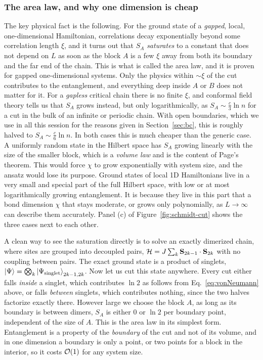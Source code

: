 \documentclass[lecture_notes.tex]{subfiles}
\begin{document}
\subsubsection{The area law, and why one dimension is cheap}
The key physical fact is the following. For the ground state of a \emph{gapped}, local,
one-dimensional Hamiltonian, correlations decay exponentially beyond some correlation length
$\xi$, and it turns out that $S_A$ \emph{saturates} to a constant that does not depend on $L$ as
soon as the block $A$ is a few $\xi$ away from both its boundary and the far end of the chain.
This is what is called the area law, and it is proven for gapped one-dimensional systems. Only
the physics within $\sim\xi$ of the cut contributes to the entanglement, and everything deep
inside $A$ or $B$ does not matter for it. For a \emph{gapless} critical chain there is no finite
$\xi$, and conformal field theory tells us that $S_A$ grows instead, but only logarithmically, as
$S_A \sim \tfrac{c}{3}\ln n$ for a cut in the bulk of an infinite or periodic chain. With open
boundaries, which we use in all this session for the reasons given in Section~\ref{sec:bc}, this
is roughly halved to $S_A\sim\tfrac{c}{6}\ln n$. In both cases this is much cheaper than the
generic case. A uniformly random state in the Hilbert space has $S_A$ growing linearly with the
size of the smaller block, which is a \emph{volume law} and is the content of Page's theorem. This
would force $\chi$ to grow exponentially with system size, and the ansatz would lose its purpose.
Ground states of local 1D Hamiltonians live in a very small and special part of the full Hilbert
space, with low or at most logarithmically growing entanglement. It is because they live in this
part that a bond dimension $\chi$ that stays moderate, or grows only polynomially, as
$L\to\infty$ can describe them accurately. Panel (c) of Figure~\ref{fig:schmidt-cut} shows the
three cases next to each other.

A clean way to see the saturation directly is to solve an exactly dimerized chain, where sites
are grouped into decoupled pairs, $\mathcal{H} = J\sum_k \vb S_{2k-1}\cdot\vb S_{2k}$ with no coupling
between pairs. The exact ground state is a product of singlets,
$\ket{\Psi} = \bigotimes_k \ket{\Psi_{\mathrm{singlet}}}_{2k-1,2k}$. Now let us cut this state
anywhere. Every cut either falls \emph{inside} a singlet, which contributes $\ln 2$ as follows from
Eq.~\eqref{eq:vonNeumann} above, or falls \emph{between} singlets, which contributes nothing, since
the two halves factorize exactly there. However large we choose the block $A$, as long as its
boundary is between dimers, $S_A$ is either $0$ or $\ln2$ per boundary point, independent of the
size of $A$. This is the area law in its simplest form. Entanglement is a property of the
\emph{boundary} of the cut and not of its volume, and in one dimension a boundary is only a point,
or two points for a block in the interior, so it costs $\mathcal{O}\!\left(1\right)$ for any system size.
\end{document}
